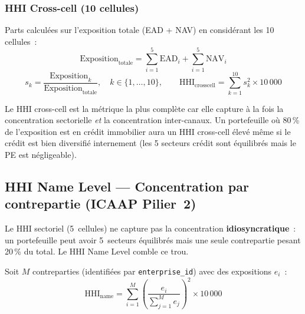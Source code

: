 \documentclass[12pt,a4paper]{article}
\begin{document}
\subsubsection{HHI Cross-cell (10 cellules)}
Parts calcul\'ees sur l'exposition totale (EAD + NAV) en consid\'erant les 10 cellules~:
\begin{equation}
    \text{Exposition}_{\text{totale}} = \sum_{i=1}^{5}\text{EAD}_i + \sum_{i=1}^{5}\text{NAV}_i
    \label{eq:exposure_total}
\end{equation}
\begin{equation}
    s_k = \frac{\text{Exposition}_k}{\text{Exposition}_{\text{totale}}}, \quad k \in \{1, \ldots, 10\}, \qquad
    \text{HHI}_{\text{crosscell}} = \sum_{k=1}^{10} s_k^2 \times 10\,000
    \label{eq:hhi_crosscell}
\end{equation}

\begin{interpretbox}
Le HHI cross-cell est la m\'etrique la plus compl\`ete car elle capture \`a la fois la concentration sectorielle \emph{et} la concentration inter-canaux. Un portefeuille o\`u 80\,\% de l'exposition est en cr\'edit immobilier aura un HHI cross-cell \'elev\'e m\^eme si le cr\'edit est bien diversifi\'e internement (les 5 secteurs cr\'edit sont \'equilibr\'es mais le PE est n\'egligeable).
\end{interpretbox}

\subsection{HHI Name Level --- Concentration par contrepartie (ICAAP Pilier~2)}
\label{subsec:hhi_name}

\begin{warningbox}
Le HHI sectoriel (5~cellules) ne capture pas la concentration \textbf{idiosyncratique}~: un portefeuille peut avoir 5~secteurs \'equilibr\'es mais une seule contrepartie pesant 20\,\% du total. Le HHI Name Level comble ce trou.
\end{warningbox}

\begin{formulebox}
Soit $M$ contreparties (identifi\'ees par \texttt{enterprise\_id}) avec des expositions $e_i$~:
\begin{equation}
    \text{HHI}_{\text{name}} = \sum_{i=1}^{M} \left(\frac{e_i}{\sum_{j=1}^{M} e_j}\right)^2 \times 10\,000
    \label{eq:hhi_name}
\end{equation}
\end{formulebox}
\end{document}
